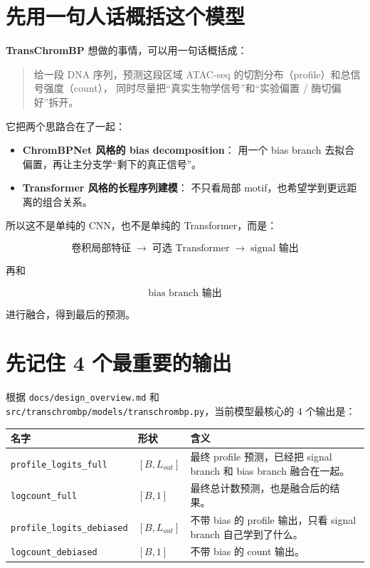 \documentclass[11pt,a4paper]{ctexart}
\begin{document}
\section{先用一句人话概括这个模型}

\textbf{TransChromBP} 想做的事情，可以用一句话概括成：

\begin{quote}
给一段 DNA 序列，预测这段区域 ATAC-seq 的切割分布（profile）和总信号强度（count），
同时尽量把“真实生物学信号”和“实验偏置 / 酶切偏好”拆开。
\end{quote}

它把两个思路合在了一起：

\begin{itemize}[leftmargin=2em]
\item \textbf{ChromBPNet 风格的 bias decomposition}：
  用一个 bias branch 去拟合偏置，再让主分支学“剩下的真正信号”。
\item \textbf{Transformer 风格的长程序列建模}：
  不只看局部 motif，也希望学到更远距离的组合关系。
\end{itemize}

所以这不是单纯的 CNN，也不是单纯的 Transformer，而是：

\[
\text{卷积局部特征} \;\rightarrow\; \text{可选 Transformer} \;\rightarrow\; \text{signal 输出}
\]

再和

\[
\text{bias branch 输出}
\]

进行融合，得到最后的预测。

\section{先记住 4 个最重要的输出}

根据 \texttt{docs/design\_overview.md} 和
\texttt{src/transchrombp/models/transchrombp.py}，当前模型最核心的 4 个输出是：

\begin{longtable}{p{} p{} p{}}
\toprule
\textbf{名字} & \textbf{形状} & \textbf{含义} \\
\midrule
\endhead
\texttt{profile\_logits\_full} & $[B, L_{out}]$ & 最终 profile 预测，已经把 signal branch 和 bias branch 融合在一起。 \\
\texttt{logcount\_full} & $[B,1]$ & 最终总计数预测，也是融合后的结果。 \\
\texttt{profile\_logits\_debiased} & $[B, L_{out}]$ & 不带 bias 的 profile 输出，只看 signal branch 自己学到了什么。 \\
\texttt{logcount\_debiased} & $[B,1]$ & 不带 bias 的 count 输出。 \\
\bottomrule
\end{longtable}
\end{document}
